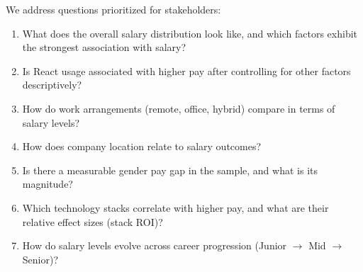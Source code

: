 We address questions prioritized for stakeholders:
\begin{enumerate}[leftmargin=*]
  \item What does the overall salary distribution look like, and which factors exhibit the strongest association with salary?
  \item Is React usage associated with higher pay after controlling for other factors descriptively?
  \item How do work arrangements (remote, office, hybrid) compare in terms of salary levels?
  \item How does company location relate to salary outcomes?
  \item Is there a measurable gender pay gap in the sample, and what is its magnitude?
  \item Which technology stacks correlate with higher pay, and what are their relative effect sizes (stack ROI)?
  \item How do salary levels evolve across career progression (Junior $\rightarrow$ Mid $\rightarrow$ Senior)?
\end{enumerate}
